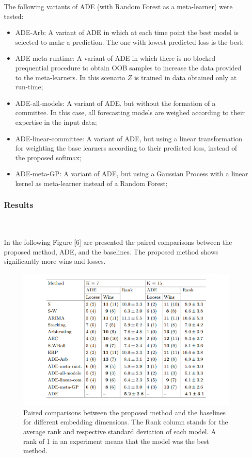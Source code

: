 \documentclass[runningheads,a4paper]{llncs}[2015/06/24]
\begin{document}
The following variants of ADE (with Random Forest as a meta-learner) were tested:
\begin{itemize}
\item ADE-Arb: A variant of ADE in which at each time point the best model is selected to make a prediction. The one with lowest predicted loss is the best;
\item ADE-meta-runtime: A variant of ADE in which there is no blocked prequential procedure to obtain OOB samples to increase the data provided to the meta-learners. In this scenario $Z$ is trained in data obtained only at run-time;
\item ADE-all-models: A variant of ADE, but without the formation of a committee. In this case, all forecasting models are weighed according to their expertise in the input data;
\item ADE-linear-committee: A variant of ADE, but using a linear transformation for weighting the base learners according to their predicted loss, instead of the proposed softmax;
\item ADE-meta-GP: A variant of ADE, but using a Gaussian Process with a linear kernel as meta-learner instead of a Random Forest;
\end{itemize}
\subsubsection{Results}
\hspace{1cm}\\\\ In the following Figure [6] are presented the paired comparisons between the proposed method, ADE, and the baselines. The proposed method shows significantly more wins and losses. 

\begin{figure}[h]
\centering
\includegraphics[width=\textwidth]{pairedComparison}
\caption{Paired comparisons between the proposed method and the baselines for different embedding dimensions. The Rank column stands for the average rank and respective standard deviation of each model. A rank of 1 in an
experiment means that the model was the best method.}
\label{fig:paired comparison}
\end{figure}
\end{document}
